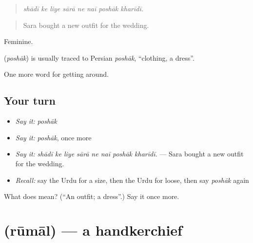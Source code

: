 \begin{quote}
       
\end{quote}

\begin{quote}
\emph{shādī ke liye sārā ne naī poshāk kharīdī.}
\end{quote}

\begin{quote}
Sara bought a new outfit for the wedding.
\end{quote}

Feminine.

\begin{cousinweb}
\textbf{} (\emph{poshāk}) is usually traced to Persian \emph{poshāk}, \textquotedblleft{}clothing, a dress\textquotedblright{}.
\end{cousinweb}

\begin{grammarlens}[title={What you've built}]
One more word for getting around.
\end{grammarlens}

\subsection*{Your turn}
\begin{itemize}
\raggedright
  \item \emph{Say it:} \emph{poshāk}
  \item \emph{Say it:} \emph{poshāk}, once more
  \item \emph{Say it:} \emph{shādī ke liye sārā ne naī poshāk kharīdī.} — Sara bought a new outfit for the wedding.
  \item \emph{Recall:} say the Urdu for a size, then the Urdu for loose, then say \emph{poshāk} again
\end{itemize}

\begin{tcolorbox}[breakable,colback=teal!4,colframe=teal!35!black,title={Before you move on}]
What does  mean? (\textquotedblleft{}An outfit; a dress\textquotedblright{}.) Say it once more.
\end{tcolorbox}
\section[\texorpdfstring{\ur{رومال} (rūmāl)}{رومال (rūmāl)}]{ (rūmāl) — a handkerchief}

\label{lesson:UR-C427-rumal}



